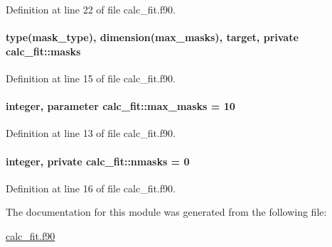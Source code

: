 Definition at line 22 of file calc\-\_\-fit.\-f90.

\hypertarget{classcalc__fit_a95cbb6fef05a28b8181f011ee2a2e38a}{
\paragraph[{masks}]{\setlength{\rightskip}{0pt plus 5cm}type(mask\-\_\-type), dimension({\bf max\-\_\-masks}), target, private calc\-\_\-fit\-::masks\hspace{0.3cm}{\ttfamily [private]}}}\label{classcalc__fit_a95cbb6fef05a28b8181f011ee2a2e38a}


Definition at line 15 of file calc\-\_\-fit.\-f90.

\hypertarget{classcalc__fit_a4b4ab2917d4cee62a409ee92aa6873d9}{
\paragraph[{max\-\_\-masks}]{\setlength{\rightskip}{0pt plus 5cm}integer, parameter calc\-\_\-fit\-::max\-\_\-masks = 10}}\label{classcalc__fit_a4b4ab2917d4cee62a409ee92aa6873d9}


Definition at line 13 of file calc\-\_\-fit.\-f90.

\hypertarget{classcalc__fit_af2fa7fc43eecba8d16cfca2fe0750b19}{
\paragraph[{nmasks}]{\setlength{\rightskip}{0pt plus 5cm}integer, private calc\-\_\-fit\-::nmasks = 0\hspace{0.3cm}{\ttfamily [private]}}}\label{classcalc__fit_af2fa7fc43eecba8d16cfca2fe0750b19}


Definition at line 16 of file calc\-\_\-fit.\-f90.



The documentation for this module was generated from the following file\-:\begin{DoxyCompactItemize}
\item 
\hyperlink{calc__fit_8f90}{calc\-\_\-fit.\-f90}\end{DoxyCompactItemize}
